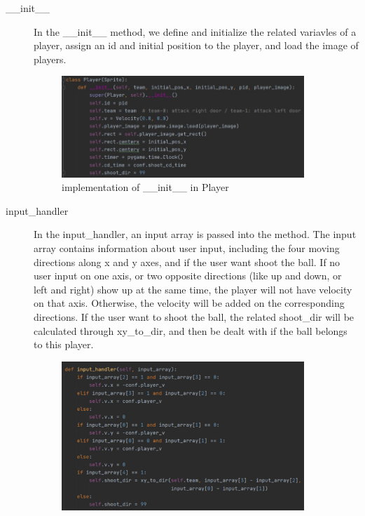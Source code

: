 \documentclass[14pt]{extarticle}
\begin{document}
\begin{description}
	\item[\_\_init\_\_]
	In the \_\_init\_\_ method, we define and initialize the related variavles of a player, assign an id and initial position to the player, and load the image of players.
	\begin{figure}[H]
		\begin{center}
			\includegraphics[width=0.9\textwidth]{Player_init}
			\caption{implementation of \_\_init\_\_ in Player}
		\end{center}
	\end{figure}
	\item[input\_handler]
	In the input\_handler, an input array is passed into the method. The input array contains information about user input, including the four moving directions along x and y axes, and if the user want shoot the ball. If no user input on one axis, or two opposite directions (like up and down, or left and right) show up at the same time, the player will not have velocity on that axis. Otherwise, the velocity will be added on the corresponding directions. If the user want to shoot the ball, the related shoot\_dir will be calculated through xy\_to\_dir, and then be dealt with if the ball belongs to this player.
	\begin{figure}[H]
		\begin{center}
			\includegraphics[width=0.9\textwidth]{Player_input}

\end{center}
\end{figure}
\end{description}
\end{document}
